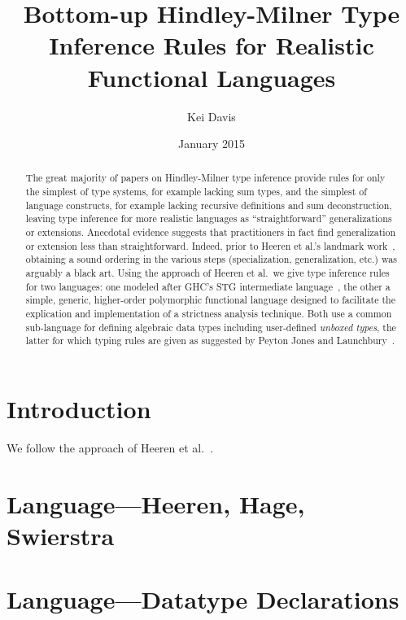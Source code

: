 \documentclass[11pt]{article}
\begin{document}

\title{Bottom-up Hindley-Milner Type Inference Rules for Realistic Functional Languages}
\author{Kei Davis}
\date{January 2015}
\maketitle

\begin{abstract}
  The great majority of papers on Hindley-Milner type inference provide rules
  for only the simplest of type systems, for example lacking sum types, and
  the simplest of language constructs, for example lacking recursive
  definitions and sum deconstruction, leaving type inference for more
  realistic languages as ``straightforward'' generalizations or extensions.
  Anecdotal evidence suggests that practitioners in fact find generalization
  or extension less than straightforward.  Indeed, prior to Heeren et al.'s
  landmark work~\cite{HHS02}, obtaining a sound ordering in the various steps
  (specialization, generalization, etc.) was arguably a black art.  Using the
  approach of Heeren et al.\ we give type inference rules for two languages:
  one modeled after GHC's STG intermediate language~\cite{PJ??}, the other a
  simple, generic, higher-order polymorphic functional language designed to
  facilitate the explication and implementation of a strictness analysis
  technique.  Both use a common sub-language for defining algebraic data types
  including user-defined \emph{unboxed types}, the latter for which typing
  rules are given as suggested by Peyton Jones and Launchbury~\cite{PJL??}.
\end{abstract}


\section{Introduction}
We follow the approach of Heeren et al.~\cite{HHS02}.

\section{Language---Heeren, Hage, Swierstra}

\section{Language---Datatype Declarations}
\end{document}
